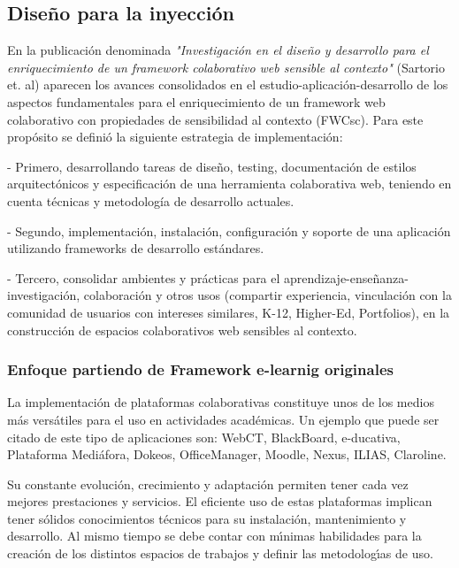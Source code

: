 \subsection{Diseño para la inyección}

En la publicación denominada \textit{"Investigación en el diseño y desarrollo para el enriquecimiento de un framework colaborativo web sensible al contexto"} (Sartorio et. al) \cite{inyecccion} aparecen los avances consolidados en el estudio-aplicación-desarrollo de los aspectos fundamentales para el enriquecimiento de un framework web colaborativo con propiedades de sensibilidad al contexto (FWCsc). Para este propósito se definió la siguiente estrategia de implementación:

- Primero, desarrollando tareas de diseño, testing, documentación de estilos arquitectónicos y especificación de una herramienta colaborativa web, teniendo en cuenta técnicas y metodología de desarrollo actuales. 

- Segundo, implementación, instalación, configuración y soporte de una aplicación utilizando frameworks de desarrollo estándares. 

- Tercero, consolidar ambientes y prácticas para el aprendizaje-enseñanza-investigación, colaboración y otros usos (compartir experiencia, vinculación con la comunidad de usuarios con intereses similares, K-12, Higher-Ed, Portfolios), en la construcción de espacios colaborativos web sensibles al contexto.

\subsubsection{Enfoque partiendo de Framework e-learnig originales}

La implementación de plataformas colaborativas constituye unos de los medios más versátiles para el uso en actividades académicas. Un ejemplo que puede ser citado de este tipo de aplicaciones son: WebCT, BlackBoard, e-ducativa, Plataforma Mediáfora, Dokeos, OfficeManager, Moodle, Nexus, ILIAS, Claroline.

Su constante evolución, crecimiento y adaptación permiten tener cada vez mejores prestaciones y servicios. El eficiente uso de estas plataformas implican tener sólidos conocimientos técnicos para su instalación, mantenimiento y desarrollo. Al mismo tiempo se debe contar con mı́nimas habilidades para la creación de los
distintos espacios de trabajos y definir las metodologı́as de uso.


